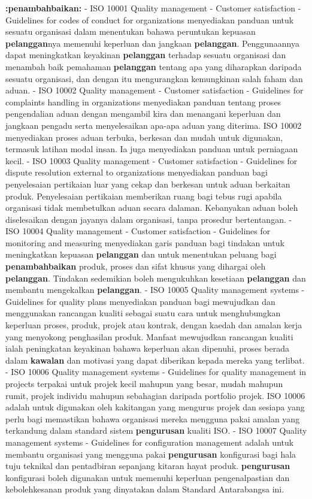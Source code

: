 \documentclass{article}
\begin{document}
\textbf{:penambahbaikan:} - ISO 10001 Quality management - Customer satisfaction - Guidelines for codes of
 conduct for organizations menyediakan panduan untuk sesuatu organisasi dalam
 menentukan bahawa peruntukan kepuasan \textbf{pelanggan}nya memenuhi keperluan dan
 jangkaan \textbf{pelanggan}. Penggunaannya dapat meningkatkan keyakinan \textbf{pelanggan}
 terhadap sesuatu organisasi dan menambah baik pemahaman \textbf{pelanggan} tentang apa
 yang diharapkan daripada sesuatu organisasi, dan dengan itu mengurangkan
 kemungkinan salah faham dan aduan.
- ISO 10002 Quality management - Customer satisfaction - Guidelines for complaints
 handling in organizations menyediakan panduan tentang proses pengendalian aduan
 dengan mengambil kira dan menangani keperluan dan jangkaan pengadu serta
 menyelesaikan apa-apa aduan yang diterima. ISO 10002 menyediakan proses aduan
 terbuka, berkesan dan mudah untuk digunakan, termasuk latihan modal insan. Ia juga
 menyediakan panduan untuk perniagaan kecil.
- ISO 10003 Quality management - Customer satisfaction - Guidelines for dispute
 resolution external to organizations menyediakan panduan bagi penyelesaian pertikaian
 luar yang cekap dan berkesan untuk aduan berkaitan produk. Penyelesaian pertikaian
 memberikan ruang bagi tebus rugi apabila organisasi tidak membetulkan aduan secara
 dalaman. Kebanyakan aduan boleh diselesaikan dengan jayanya dalam organisasi,
 tanpa prosedur bertentangan.
- ISO 10004 Quality management - Customer satisfaction - Guidelines for monitoring and
 measuring menyediakan garis panduan bagi tindakan untuk meningkatkan kepuasan
 \textbf{pelanggan} dan untuk menentukan peluang bagi \textbf{penambahbaikan} produk, proses dan
 sifat khusus yang dihargai oleh \textbf{pelanggan}. Tindakan sedemikian boleh mengukuhkan
 kesetiaan \textbf{pelanggan} dan membantu mengekalkan \textbf{pelanggan}.
- ISO 10005 Quality management systems - Guidelines for quality plans menyediakan
 panduan bagi mewujudkan dan menggunakan rancangan kualiti sebagai suatu cara
 untuk menghubungkan keperluan proses, produk, projek atau kontrak, dengan kaedah
 dan amalan kerja yang menyokong penghasilan produk. Manfaat mewujudkan rancangan
 kualiti ialah peningkatan keyakinan bahawa keperluan akan dipenuhi, proses berada
 dalam \textbf{kawalan} dan motivasi yang dapat diberikan kepada mereka yang terlibat.
- ISO 10006 Quality management systems - Guidelines for quality management in projects
 terpakai untuk projek kecil mahupun yang besar, mudah mahupun rumit, projek individu
 mahupun sebahagian daripada portfolio projek. ISO 10006 adalah untuk digunakan oleh
 kakitangan yang mengurus projek dan sesiapa yang perlu bagi memastikan bahawa
 organisasi mereka mengguna pakai amalan yang terkandung dalam standard sistem
 \textbf{pengurusan} kualiti ISO.
- ISO 10007 Quality management systems - Guidelines for configuration management
 adalah untuk membantu organisasi yang mengguna pakai \textbf{pengurusan} konfigurasi bagi
 hala tuju teknikal dan pentadbiran sepanjang kitaran hayat produk. \textbf{pengurusan}
 konfigurasi boleh digunakan untuk memenuhi keperluan pengenalpastian dan
 kebolehkesanan produk yang dinyatakan dalam Standard Antarabangsa ini.
\end{document}
